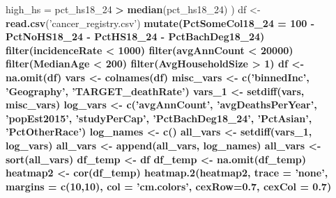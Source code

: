 \documentclass[
  11pt,
]{article}
\newenvironment{Shaded}{\begin{snugshade}}{\end{snugshade}}
\newcommand{\DataTypeTok}[1]{\textcolor[rgb]{0.13,0.29,0.53}{#1}}
\newcommand{\DecValTok}[1]{\textcolor[rgb]{0.00,0.00,0.81}{#1}}
\newcommand{\FloatTok}[1]{\textcolor[rgb]{0.00,0.00,0.81}{#1}}
\newcommand{\KeywordTok}[1]{\textcolor[rgb]{0.13,0.29,0.53}{\textbf{#1}}}
\newcommand{\NormalTok}[1]{#1}
\newcommand{\OperatorTok}[1]{\textcolor[rgb]{0.81,0.36,0.00}{\textbf{#1}}}
\newcommand{\StringTok}[1]{\textcolor[rgb]{0.31,0.60,0.02}{#1}}
\begin{document}
\begin{Shaded}
\begin{Highlighting}[]
{{{{{{{{{{{    \DataTypeTok{high_hs =}\NormalTok{ pct_hs18_}\DecValTok{24} \OperatorTok{>}\StringTok{ }\KeywordTok{median}\NormalTok{(pct_hs18_}\DecValTok{24}\NormalTok{)}
\NormalTok{  )}
\NormalTok{df <-}\StringTok{ }\KeywordTok{read.csv}\NormalTok{(}\StringTok{'cancer_registry.csv'}\NormalTok{) }\OperatorTok{%
\StringTok{  }\KeywordTok{mutate}\NormalTok{(}\DataTypeTok{PctSomeCol18_24 =} \DecValTok{100} \OperatorTok{-}\StringTok{ }\NormalTok{PctNoHS18_}\DecValTok{24} \OperatorTok{-}\StringTok{ }\NormalTok{PctHS18_}\DecValTok{24} \OperatorTok{-}\StringTok{ }\NormalTok{PctBachDeg18_}\DecValTok{24}\NormalTok{) }\OperatorTok{%
\StringTok{  }\KeywordTok{filter}\NormalTok{(incidenceRate }\OperatorTok{<}\StringTok{ }\DecValTok{1000}\NormalTok{) }\OperatorTok{%
\StringTok{  }\KeywordTok{filter}\NormalTok{(avgAnnCount }\OperatorTok{<}\StringTok{ }\DecValTok{20000}\NormalTok{) }\OperatorTok{%
\StringTok{  }\KeywordTok{filter}\NormalTok{(MedianAge }\OperatorTok{<}\StringTok{ }\DecValTok{200}\NormalTok{) }\OperatorTok{%
\StringTok{  }\KeywordTok{filter}\NormalTok{(AvgHouseholdSize }\OperatorTok{>}\StringTok{ }\DecValTok{1}\NormalTok{)}
\NormalTok{df <-}\StringTok{ }\KeywordTok{na.omit}\NormalTok{(df)}
\NormalTok{vars <-}\StringTok{ }\KeywordTok{colnames}\NormalTok{(df)}
\NormalTok{misc_vars <-}\StringTok{ }\KeywordTok{c}\NormalTok{(}\StringTok{'binnedInc'}\NormalTok{, }\StringTok{'Geography'}\NormalTok{, }\StringTok{'TARGET_deathRate'}\NormalTok{)}
\NormalTok{vars_}\DecValTok{1}\NormalTok{ <-}\StringTok{ }\KeywordTok{setdiff}\NormalTok{(vars, misc_vars)}
\NormalTok{log_vars <-}\StringTok{ }\KeywordTok{c}\NormalTok{(}\StringTok{'avgAnnCount'}\NormalTok{, }\StringTok{'avgDeathsPerYear'}\NormalTok{, }\StringTok{'popEst2015'}\NormalTok{, }\StringTok{'studyPerCap'}\NormalTok{, }\StringTok{'PctBachDeg18_24'}\NormalTok{, }\StringTok{'PctAsian'}\NormalTok{, }\StringTok{'PctOtherRace'}\NormalTok{)}
\NormalTok{log_names <-}\StringTok{ }\KeywordTok{c}\NormalTok{()}
\NormalTok{all_vars <-}\StringTok{ }\KeywordTok{setdiff}\NormalTok{(vars_}\DecValTok{1}\NormalTok{, log_vars)}
\NormalTok{all_vars <-}\StringTok{ }\KeywordTok{append}\NormalTok{(all_vars, log_names)}
\NormalTok{all_vars <-}\StringTok{ }\KeywordTok{sort}\NormalTok{(all_vars)}
\NormalTok{df_temp <-}\StringTok{ }\NormalTok{df }\OperatorTok{%
\NormalTok{df_temp <-}\StringTok{ }\KeywordTok{na.omit}\NormalTok{(df_temp)}
\NormalTok{heatmap2 <-}\StringTok{ }\KeywordTok{cor}\NormalTok{(df_temp)}
\KeywordTok{heatmap.2}\NormalTok{(heatmap2, }\DataTypeTok{trace =} \StringTok{'none'}\NormalTok{, }\DataTypeTok{margins =} \KeywordTok{c}\NormalTok{(}\DecValTok{10}\NormalTok{,}\DecValTok{10}\NormalTok{), }\DataTypeTok{col =} \StringTok{'cm.colors'}\NormalTok{, }\DataTypeTok{cexRow=}\FloatTok{0.7}\NormalTok{, }\DataTypeTok{cexCol =} \FloatTok{0.7}\NormalTok{)}
}}}}}}}}}}}}}}}}}
\end{Highlighting}
\end{Shaded}
\end{document}
